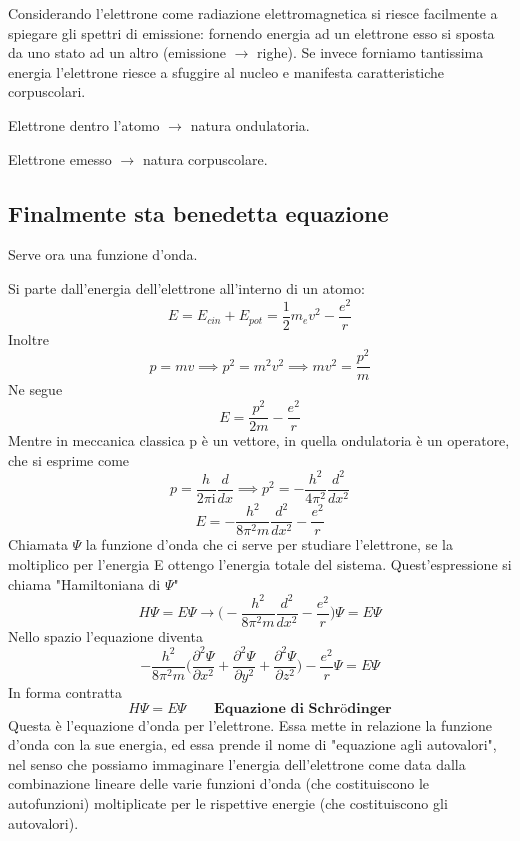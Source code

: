 Considerando l'elettrone come radiazione elettromagnetica si riesce facilmente a spiegare gli spettri di emissione: fornendo energia ad un elettrone esso si sposta da uno stato ad un altro (emissione $\rightarrow$ righe). Se invece forniamo tantissima energia l'elettrone riesce a sfuggire al nucleo e manifesta caratteristiche corpuscolari.

Elettrone dentro l'atomo $\rightarrow$ natura ondulatoria.

Elettrone emesso $\rightarrow$ natura corpuscolare.
\subsection{Finalmente sta benedetta equazione}
Serve ora una funzione d'onda.

Si parte dall'energia dell'elettrone all'interno di un atomo:
$$E=E_{cin} + E_{pot}=\frac{1}{2}m_ev^2 - \frac{e^2}{r}$$
Inoltre
$$p=mv \implies p^2=m^2v^2 \implies mv^2=\frac{p^2}{m}$$
Ne segue
$$E=\frac{p^2}{2m} - \frac{e^2}{r}$$
Mentre in meccanica classica p è un vettore, in quella ondulatoria è un operatore, che si esprime come
$$p=\frac{h}{2\pi \text{i}}\frac{d}{dx}\implies p^2=-\frac{h^2}{4\pi^2}\frac{d^2}{dx^2}$$
$$E=-\frac{h^2}{8\pi^2m}\frac{d^2}{dx^2} -\frac{e^2}{r}$$
Chiamata $\Psi$ la funzione d'onda che ci serve per studiare l'elettrone, se la moltiplico per l'energia E ottengo l'energia totale del sistema. Quest'espressione si chiama "Hamiltoniana di $\Psi$"
$$H\Psi=E\Psi \rightarrow \biggl(-\frac{h^2}{8\pi^2m}\frac{d^2}{dx^2} -\frac{e^2}{r}\biggr)\Psi=E\Psi$$
Nello spazio l'equazione diventa
$$-\frac{h^2}{8\pi^2m}\biggl( \frac{\partial^2\Psi}{\partial x^2}+\frac{\partial^2\Psi}{\partial y^2}+\frac{\partial^2\Psi}{\partial z^2}\biggr) -\frac{e^2}{r}\Psi =E\Psi$$
In forma contratta
$$H\Psi=E\Psi \qquad \textbf{Equazione di Schrödinger}$$
Questa è l'equazione d'onda per l'elettrone. Essa mette in relazione la funzione d'onda con la sue energia, ed essa prende il nome di "equazione agli autovalori", nel senso che possiamo immaginare l'energia dell'elettrone come data dalla combinazione lineare delle varie funzioni d'onda (che costituiscono le autofunzioni) moltiplicate per le rispettive energie (che costituiscono gli autovalori).

